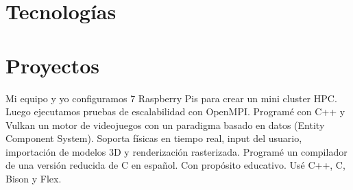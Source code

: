 \documentclass[10pt, a4paper]{moderncv}
\begin{document}
\section{Tecnologías}

\section{Proyectos}
{
	Mi equipo y yo configuramos 7 Raspberry Pis para crear un mini cluster HPC.
	Luego ejecutamos pruebas de escalabilidad con OpenMPI.
}
{
	Programé con C++ y Vulkan un motor de videojuegos con un paradigma basado en datos (Entity Component System).
	Soporta físicas en tiempo real, input del usuario, importación de modelos 3D y renderización rasterizada.
}
{
	Programé un compilador de una versión reducida de C en español.
	Con propósito educativo.
	Usé C++, C, Bison y Flex.
}


\end{document}
